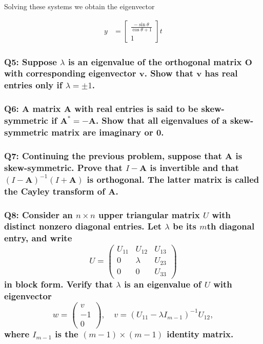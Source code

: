 \documentclass{article}
\begin{document}
Solving these systems we obtain the eigenvector 

\begin{align}
    y &= \begin{bmatrix}
           \frac{-\sin \theta }{\cos \theta +1} \\
           1
         \end{bmatrix}t 
\end{align}

\subsubsection*{Q5: Suppose \(\lambda\) is an eigenvalue of the orthogonal matrix \(\mathbf{O}\) with corresponding eigenvector \(\mathbf{v}\). Show that \(\mathbf{v}\) has real entries only if \(\lambda = \pm 1\).}

\subsubsection*{Q6: A matrix \(\mathbf{A}\) with real entries is said to be skew-symmetric if \(\mathbf{A}^* = -\mathbf{A}\). Show that all eigenvalues of a skew-symmetric matrix are imaginary or 0.}

\subsubsection*{Q7: Continuing the previous problem, suppose that \(\mathbf{A}\) is skew-symmetric. Prove that \(I - \mathbf{A}\) is invertible and that \((I - \mathbf{A})^{-1}(I + \mathbf{A})\) is orthogonal. The latter matrix is called the Cayley transform of \(\mathbf{A}\).}

\subsubsection*{Q8: Consider an \(n \times n\) upper triangular matrix \(U\) with distinct nonzero diagonal entries. Let \(\lambda\) be its \(m\)th diagonal entry, and write
\[
U = \begin{pmatrix}
U_{11} & U_{12} & U_{13} \\
0 & \lambda & U_{23} \\
0 & 0 & U_{33}
\end{pmatrix}
\]
in block form. Verify that \(\lambda\) is an eigenvalue of \(U\) with eigenvector
\[
w = \begin{pmatrix}
v \\
-1 \\
0
\end{pmatrix}, \quad v = (U_{11} - \lambda I_{m-1})^{-1} U_{12},
\]
where \(I_{m-1}\) is the \((m - 1) \times (m - 1)\) identity matrix.}
\end{document}
